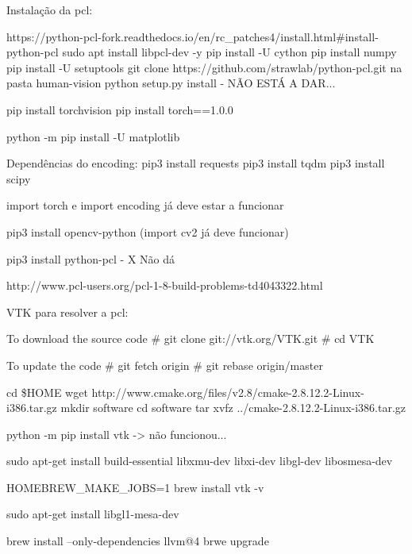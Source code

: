         Instalação da pcl:
        
        https://python-pcl-fork.readthedocs.io/en/rc\_patches4/install.html\#install-python-pcl
            sudo apt install libpcl-dev -y
            pip install -U cython
            pip install numpy
            pip install -U setuptools
            git clone https://github.com/strawlab/python-pcl.git na pasta human-vision
            python setup.py install - NÃO ESTÁ A DAR...
            
            pip install torchvision
            pip install torch==1.0.0
            
            python -m pip install -U matplotlib
        
        Dependências do encoding:
            pip3 install requests
            pip3 install tqdm
            pip3 install scipy
        
            import torch e import encoding já deve estar a funcionar
            
            pip3 install opencv-python (import cv2 já deve funcionar)
            
            pip3 install python-pcl - X Não dá
            
            http://www.pcl-users.org/pcl-1-8-build-problems-td4043322.html
            
            VTK para resolver a pcl:
            
            To download the source code 
             \# git clone git://vtk.org/VTK.git
             \# cd VTK
             
            To update the code
             \# git fetch origin
             \# git rebase origin/master
             
             
             cd \$HOME
            wget http://www.cmake.org/files/v2.8/cmake-2.8.12.2-Linux-i386.tar.gz
            mkdir software
            cd software
            tar xvfz ../cmake-2.8.12.2-Linux-i386.tar.gz
            
            
            python -m pip install vtk -> não funcionou...
            
            sudo apt-get install build-essential libxmu-dev libxi-dev libgl-dev libosmesa-dev
            
            HOMEBREW\_MAKE\_JOBS=1 brew install vtk -v
            
            sudo apt-get install libgl1-mesa-dev

        
            brew install --only-dependencies llvm@4
            brwe upgrade
            
